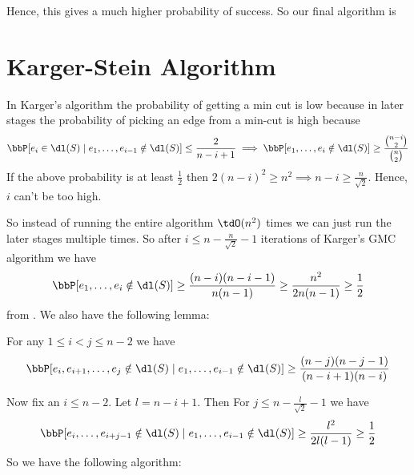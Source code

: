 Hence, this gives a much higher probability of success. So our final algorithm is
\begin{algorithm}
	\caption{Multiple run of Karger's GMC Algorithm}
\end{algorithm}
\section{Karger-Stein Algorithm}
In Karger's algorithm the probability of getting a min cut is low because in later stages the probability of picking an edge from a min-cut is high because $$\bbP[e_i\in \dl(S)\mid e_1,\dots,e_{i-1}\notin \dl(S)]  \leq \frac{2}{n-i+1}\implies \bbP[e_1,\dots, e_i\notin \dl(S)]\geq \frac{\binom{n-i}2}{\binom{n}{2}}$$  If the above probability is at least $\frac12$ then $2(n-i)^2\geq n^2\implies n-i\geq \frac{n}{\sqrt{2}}$. Hence, $i$ can't be too high.

So instead of running the entire algorithm $\tdO(n^2)$ times we can just run the later stages multiple times. So after $i\leq n-\frac{n}{\sqrt{2}}-1$ iterations of Karger's GMC algorithm we have $$\bbP[e_1,\dots, e_i\notin\dl(S)]\geq \frac{(n-i)(n-i-1)}{n(n-1)}\geq \frac{n^2}{2n(n-1)}\geq \frac12$$ from . We also have the following lemma:
\begin{lemma}{}{}
	For any $1\leq i<j\leq n-2$ we have $$\bbP[e_i,e_{i+1},\dots, e_j\notin \dl(S)\mid e_1,\dots,e_{i-1}\notin \dl(S)]  \geq \frac{(n-j)(n-j-1)}{(n-i+1)(n-i)}$$
\end{lemma}
Now fix an $i\leq n-2$. Let $l=n-i+1$. Then For $j\leq n-\frac{l}{\sqrt{2}}-1$ we have $$\bbP[e_i,\dots, e_{i+j-1}\notin\dl(S)\mid e_1,\dots, e_{i-1}\notin \dl(S)]\geq \frac{l^2}{2l(l-1)}\geq \frac12$$So we have the following algorithm:
\begin{algorithm}
	\caption{KS-Algorithm}
\end{algorithm}

